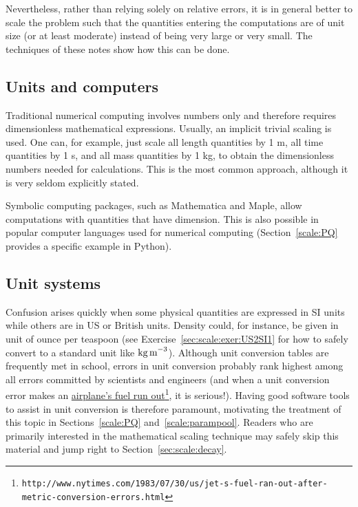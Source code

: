 \documentclass[graybox,envcountchap,sectrefs,final]{svmonodo}
\begin{document}
Nevertheless, rather than relying solely on relative errors, it is in general
better to scale the problem such that the quantities entering the
computations are of unit size (or at least moderate) instead of being very
large or very small. The techniques of these notes show how this
can be done.

\subsection{Units and computers}

Traditional numerical computing involves numbers only and therefore
requires dimensionless mathematical expressions. Usually, an implicit
trivial scaling is used. One can, for example, just scale all length
quantities by 1 m, all time quantities by 1 s, and all mass quantities
by 1 kg, to obtain the dimensionless numbers needed for calculations.
This is the most common approach, although it is very seldom explicitly
stated.

Symbolic computing packages, such as Mathematica and Maple, allow
computations with quantities that have dimension. This is also possible
in popular computer languages used for numerical computing (Section~\ref{scale:PQ} provides a specific example in Python).


\subsection{Unit systems}


Confusion arises quickly when some physical quantities are expressed
in SI units while others are in US or British units.  Density could,
for instance, be given in unit of ounce per teaspoon (see Exercise~\ref{sec:scale:exer:US2SI1} for how to safely convert to a standard
unit like $\hbox{kg\,m}^{-3}$).  Although unit conversion tables are
frequently met in school, errors in unit conversion probably rank
highest among all errors committed by scientists and engineers (and
when a unit conversion error makes an \href{{http://www.nytimes.com/1983/07/30/us/jet-s-fuel-ran-out-after-metric-conversion-errors.html}}{airplane's fuel run out}\footnote{\texttt{http://www.nytimes.com/1983/07/30/us/jet-s-fuel-ran-out-after-metric-conversion-errors.html}},
it is serious!).  Having good software tools to assist in unit
conversion is therefore paramount, motivating the treatment of this
topic in Sections~\ref{scale:PQ} and~\ref{scale:parampool}.  Readers who
are primarily interested in the mathematical scaling technique may
safely skip this material and jump right to Section~\ref{sec:scale:decay}.
\end{document}
